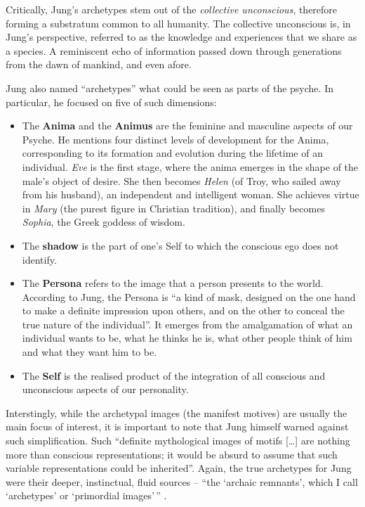 \documentclass[]{book}
\providecommand{\tightlist}{%
  \setlength{\itemsep}{0pt}\setlength{\parskip}{0pt}}
\begin{document}
Critically, Jung's archetypes stem out of the \emph{collective unconscious}, therefore forming a substratum common to all humanity. The collective unconscious is, in Jung's perspective, referred to as the knowledge and experiences that we share as a species. A reminiscent echo of information passed down through generations from the dawn of mankind, and even afore.

Jung also named ``archetypes'' what could be seen as parts of the psyche. In particular, he focused on five of such dimensions:

\begin{itemize}
\tightlist
\item
  The \textbf{Anima} and the \textbf{Animus} are the feminine and masculine aspects of our Psyche. He mentions four distinct levels of development for the Anima, corresponding to its formation and evolution during the lifetime of an individual. \emph{Eve} is the first stage, where the anima emerges in the shape of the male's object of desire. She then becomes \emph{Helen} (of Troy, who sailed away from his husband), an independent and intelligent woman. She achieves virtue in \emph{Mary} (the purest figure in Christian tradition), and finally becomes \emph{Sophia}, the Greek goddess of wisdom.
\item
  The \textbf{shadow} is the part of one's Self to which the conscious ego does not identify.
\item
  The \textbf{Persona} refers to the image that a person presents to the world. According to Jung, the Persona is ``a kind of mask, designed on the one hand to make a definite impression upon others, and on the other to conceal the true nature of the individual''. It emerges from the amalgamation of what an individual wants to be, what he thinks he is, what other people think of him and what they want him to be.
\item
  The \textbf{Self} is the realised product of the integration of all conscious and unconscious aspects of our personality.
\end{itemize}

Interstingly, while the archetypal images (the manifest motives) are usually the main focus of interest, it is important to note that Jung himself warned against such simplification. Such ``definite mythological images of motifs {[}\ldots{]} are nothing more than conscious representations; it would be absurd to assume that such variable representations could be inherited''. Again, the true archetypes for Jung were their deeper, instinctual, fluid sources -- ``the `archaic remnants', which I call `archetypes' or `primordial images'\,'' \citep{jung1964approaching}.
\end{document}
